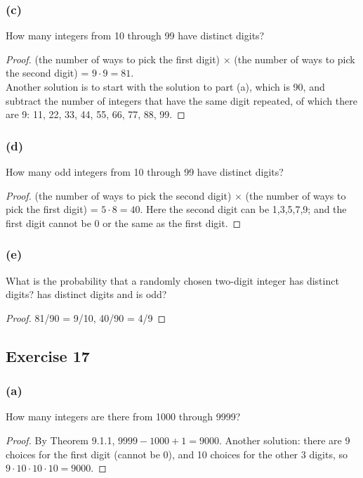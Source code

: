 \documentclass[14pt]{extarticle}
\begin{document}
\subsubsection{(c)}
How many integers from 10 through 99 have distinct digits?

\begin{proof}
     (the number of ways to pick the first digit) \(\times\) (the number of ways to pick the second digit) =
     \(9 \cdot 9 = 81\). \\
     Another solution is to start with the solution to part (a), which is 90, and subtract the number of integers that have
     the same digit repeated, of which there are 9: 11, 22, 33, 44, 55, 66, 77, 88, 99.
\end{proof}

\subsubsection{(d)}
How many odd integers from 10 through 99 have distinct digits?

\begin{proof}
     (the number of ways to pick the second digit) \(\times\) (the number of ways to pick the first digit) = \(5 \cdot 8
     = 40\). Here the second digit can be 1,3,5,7,9; and the first digit cannot be 0 or the same as the first digit.
\end{proof}

\subsubsection{(e)}
What is the probability that a randomly chosen two-digit integer has distinct digits? has distinct digits and is odd?

\begin{proof}
     81/90 = 9/10, 40/90 = 4/9
\end{proof}

\subsection{Exercise 17}
\subsubsection{(a)}
How many integers are there from 1000 through 9999?

\begin{proof}
     By Theorem 9.1.1, \(9999-1000+1 = 9000\). Another solution: there are 9 choices for the first digit (cannot be 0), and
     10 choices for the other 3 digits, so \(9 \cdot 10 \cdot 10 \cdot 10 = 9000\).
\end{proof}
\end{document}
